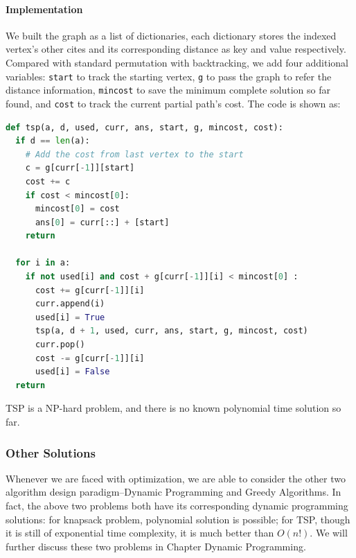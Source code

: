 \documentclass[../main.tex]{subfiles}
\begin{document}
\paragraph{Implementation}  We built the graph as a list of dictionaries, each dictionary stores the indexed vertex's other cites and its corresponding distance as key and value respectively. Compared with standard permutation with backtracking, we add four additional variables: \texttt{start} to track the starting vertex, \texttt{g} to pass the graph to refer the distance information, \texttt{mincost} to save the minimum complete solution so far found, and \texttt{cost} to track the current partial path's cost. The code is shown as: 
\begin{lstlisting}[language=Python]
def tsp(a, d, used, curr, ans, start, g, mincost, cost):
  if d == len(a): 
    # Add the cost from last vertex to the start
    c = g[curr[-1]][start]
    cost += c
    if cost < mincost[0]:
      mincost[0] = cost
      ans[0] = curr[::] + [start]
    return
  
  for i in a:
    if not used[i] and cost + g[curr[-1]][i] < mincost[0] :
      cost += g[curr[-1]][i]
      curr.append(i)
      used[i] = True      
      tsp(a, d + 1, used, curr, ans, start, g, mincost, cost)
      curr.pop()
      cost -= g[curr[-1]][i]
      used[i] = False
  return
\end{lstlisting}
TSP is a NP-hard problem, and there is no known polynomial time solution so far.



\subsubsection{Other Solutions}
Whenever we are faced with optimization, we are able to consider the other two algorithm design paradigm--Dynamic Programming and Greedy Algorithms. In fact, the above two problems both have its corresponding dynamic programming solutions: for knapsack problem, polynomial solution is possible; for TSP, though it is still of exponential time complexity, it is much better than $O(n!)$. We will further discuss these two problems in Chapter Dynamic Programming. 
\end{document}
